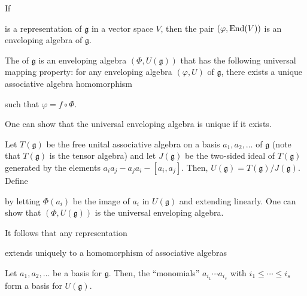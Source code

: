 \documentclass [11 pt, twoside] {article}
\begin{document}
\begin{example}[ ]\label{}\text{}
If 
is a representation of $\mathfrak{g}$ in a vector space $V$, then the pair $(\varphi,\operatorname{End}(V))$ is an enveloping algebra of $\mathfrak{g}$.
\end{example}

\begin{definition}[ ]\label{}\text{}
The  of $\mathfrak{g}$ is an enveloping algebra $(\Phi, U(\mathfrak{g}))$ that has the following universal mapping property: for any enveloping algebra $(\varphi, U)$ of $\mathfrak{g}$, there exists a unique associative algebra homomorphism
such that $\varphi = f\circ \Phi$.
\end{definition}

One can show that the universal enveloping algebra is unique if it exists.

Let $T(\mathfrak{g})$ be the free unital associative algebra on a basis $a_1,a_2,\hdots$ of $\mathfrak{g}$ (note that $T(\mathfrak{g})$ is the tensor algebra) and let $J(\mathfrak{g})$ be the two-sided ideal of $T(\mathfrak{g})$ generated by the elements $a_{i}a_{j}-a_{j}a_{i}-[a_{i},a_{j}]$. Then, $U(\mathfrak{g}) = T(\mathfrak{g}) /J(\mathfrak{g})$. Define
by letting $\Phi(a_{i})$ be the image of $a_{i}$ in $U(\mathfrak{g})$ and extending linearly.
One can show that $(\Phi,U(\mathfrak{g}))$ is the universal enveloping algebra.

It follows that any representation 
extends uniquely to a homomorphism of associative algebras

\begin{theorem}\label{pbw}\text{}
Let $a_1,a_2,\hdots$ be a basis for $\mathfrak{g}$.
Then, the ``monomials'' $a_{i_1}\cdots a_{i_{s}}$ with $i_1\le\cdots\le i_{s}$ form a basis for $U(\mathfrak{g})$.
\end{theorem}
\end{document}
